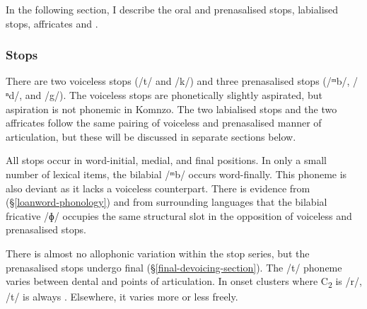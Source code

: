 In the following section, I describe the oral and prenasalised stops, labialised  stops, affricates and .

\subsubsection{Stops} \label{stopss}

There are two voiceless stops (/t/ and /k/) and three prenasalised stops (/{ᵐ}b/, /{ⁿ}d/, and /{\ᵑ}g/). The voiceless stops are phonetically slightly aspirated, but aspiration is not phonemic in Komnzo. The two labialised  stops and the two affricates follow the same pairing of voiceless and prenasalised manner of articulation, but these will be discussed in separate sections below.

All stops occur in word-initial, medial, and final positions. In only a small number of lexical items, the bilabial /{ᵐ}b/ occurs word-finally. This phoneme is also deviant as it lacks a voiceless counterpart. There is evidence from   ({\S}\ref{loanword-phonology}) and from surrounding  languages that the bilabial fricative /ɸ/ occupies the same structural slot in the opposition of voiceless and prenasalised stops.

There is almost no allophonic variation within the stop series, but the prenasalised stops undergo final  ({\S}\ref{final-devoicing-section}). The /t/ phoneme varies between dental and  points of articulation. In onset clusters where C\textsubscript{2} is /r/, /t/ is always . Elsewhere, it varies more or less freely.

